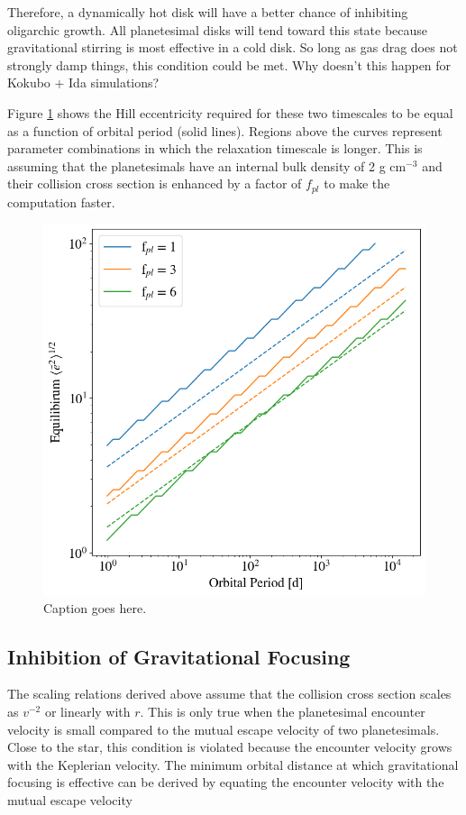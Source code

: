 \documentclass[onecolumn]{aastex63}
\begin{document}
Therefore, a dynamically hot disk will have a better chance of inhibiting oligarchic growth. All planetesimal disks will tend toward this state because gravitational stirring is most effective in a cold disk. So long as gas drag does not strongly damp things, this condition could be met. Why doesn't this happen for Kokubo + Ida simulations?

Figure \ref{fig:time_eq_gf} shows the Hill eccentricity required for these two timescales to be equal as a function of orbital period (solid lines). Regions above the curves represent parameter combinations in which the relaxation timescale is longer. This is assuming that the planetesimals have an internal bulk density of 2 g cm$^{-3}$ and their collision cross section is enhanced by a factor of $f_{pl}$ to make the computation faster.

\begin{figure}
    \begin{center}
    \includegraphics[width=0.5\columnwidth]{figures/time_eq_gf.png}
    \caption{Caption goes here.\label{fig:time_eq_gf}}
    \end{center}
\end{figure}

\subsection{Inhibition of Gravitational Focusing}

The scaling relations derived above assume that the collision cross section scales as $v^{-2}$ or linearly with $r$. This is only true when the planetesimal encounter velocity is small compared to the mutual escape velocity of two planetesimals. Close to the star, this condition is violated because the encounter velocity grows with the Keplerian velocity. The minimum orbital distance at which gravitational focusing is effective can be derived by equating the encounter velocity with the mutual escape velocity
\end{document}
